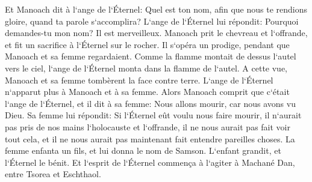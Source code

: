 \verse Et Manoach dit à l`ange de l`Éternel: Quel est ton nom, afin que nous te rendions gloire, quand ta parole s`accomplira? 
\verse L`ange de l`Éternel lui répondit: Pourquoi demandes-tu mon nom? Il est merveilleux. 
\verse Manoach prit le chevreau et l`offrande, et fit un sacrifice à l`Éternel sur le rocher. Il s`opéra un prodige, pendant que Manoach et sa femme regardaient. 
\verse Comme la flamme montait de dessus l`autel vers le ciel, l`ange de l`Éternel monta dans la flamme de l`autel. A cette vue, Manoach et sa femme tombèrent la face contre terre. 
\verse L`ange de l`Éternel n`apparut plus à Manoach et à sa femme. Alors Manoach comprit que c`était l`ange de l`Éternel, 
\verse et il dit à sa femme: Nous allons mourir, car nous avons vu Dieu. 
\verse Sa femme lui répondit: Si l`Éternel eût voulu nous faire mourir, il n`aurait pas pris de nos mains l`holocauste et l`offrande, il ne nous aurait pas fait voir tout cela, et il ne nous aurait pas maintenant fait entendre pareilles choses. 
\verse La femme enfanta un fils, et lui donna le nom de Samson. L`enfant grandit, et l`Éternel le bénit. 
\verse Et l`esprit de l`Éternel commença à l`agiter à Machané Dan, entre Tsorea et Eschthaol. 

\chapter{}


